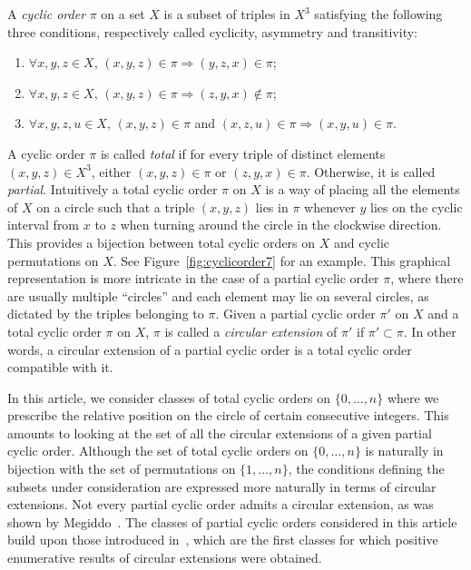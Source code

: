 A \emph{cyclic order} $\pi$ on a set $X$ is a subset of triples in $X^3$ satisfying the following three conditions, respectively called cyclicity, asymmetry and transitivity:
\begin{enumerate}
\item $\forall x, y, z \in X$, $(x,y,z) \in \pi \Rightarrow (y,z,x) \in \pi$;\label{liste1.1}
\item $\forall x,y,z \in X$, $(x,y,z) \in \pi \Rightarrow (z,y,x) \not \in \pi$;\label{liste1.2}
\item $\forall x,y,z,u \in X$, $(x,y,z) \in \pi$ and $(x,z,u) \in \pi \Rightarrow (x,y,u) \in \pi$.\label{liste1.3}
\end{enumerate}
A cyclic order $\pi$ is called \emph{total} if for every triple of distinct elements $(x,y,z) \in X^3$, either $(x,y,z)\in \pi$ or $(z,y,x) \in \pi$. Otherwise, it is called \emph{partial}. Intuitively a total cyclic order $\pi$ on $X$ is a way of placing all the elements of $X$ on a circle such that a triple $(x,y,z)$ lies in $\pi$ whenever $y$ lies on the cyclic interval from $x$ to $z$ when turning around the circle in the clockwise direction. This provides a bijection between total cyclic orders on $X$ and cyclic permutations on $X$. See Figure~\ref{fig:cyclicorder7} for an example. This graphical representation is more intricate in the case of a partial cyclic order $\pi$, where there are usually multiple ``circles'' and each element may lie on several circles, as dictated by the triples belonging to $\pi$. Given a partial cyclic order $\pi'$ on $X$ and a total cyclic order $\pi$ on $X$, $\pi$ is called a \emph{circular extension} of $\pi'$ if $\pi' \subset \pi$. In other words, a circular extension of a partial cyclic order is a total cyclic order compatible with it.

In this article, we consider classes of total cyclic orders on $\{0,\ldots,n\}$ where we prescribe the relative position on the circle of certain consecutive integers. This amounts to looking at the set of all the circular extensions of a given partial cyclic order. Although the set of total cyclic orders on $\{0,\ldots,n\}$ is naturally in bijection with the set of permutations on $\{1,\ldots,n\}$, the conditions defining the subsets under consideration are expressed more naturally in terms of circular extensions. Not every partial cyclic order admits a circular extension, as was shown by Megiddo~\cite{M76}. The classes of partial cyclic orders considered in this article build upon those introduced in~\cite{R17}, which are the first classes for which positive enumerative results of circular extensions were obtained.

